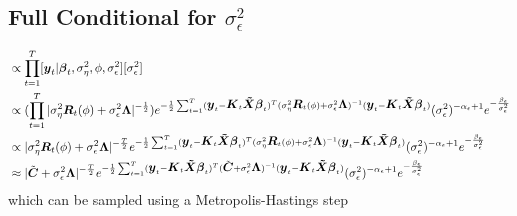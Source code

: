\documentclass[fleqn]{article}
\def\bm#1{\mbox{\boldmath $#1$}}
\begin{document}
\subsection{Full Conditional for $\sigma^2_\epsilon$}
%
\begin{align*}
[\sigma^2_\epsilon | \cdot] & \propto \prod_{t = 1}^T [\bm{y}_t | \bm{\beta}_t, \sigma^2_\eta, \phi, \sigma^2_\epsilon] [\sigma^2_\epsilon]\\
%
& \propto (\prod_{t = 1}^T |\sigma^2_\eta \bm{R}_t(\phi) + \sigma^2_\epsilon \bm{\Lambda} |^{ - \frac{1} {2}}) e^{ - \frac{1} {2} \sum_{t = 1}^T (\bm{y}_t - \bm{K}_t \bm{\tilde{X}} \bm{\beta}_t)^T (\sigma^2_\eta \bm{R}_t(\phi) + \sigma^2_\epsilon \bm{\Lambda})^{ - 1} (\bm{y}_t - \bm{K}_t \bm{\tilde{X}} \bm{\beta}_t)} (\sigma^2_\epsilon)^{ - \alpha_\epsilon + 1} e^{ - \frac{\beta_\epsilon} {\sigma^2_\epsilon}}\\
%
& \propto |\sigma^2_\eta \bm{R}_t(\phi) + \sigma^2_\epsilon \bm{\Lambda} |^{ - \frac{T} {2}} e^{ - \frac{1} {2} \sum_{t = 1}^T (\bm{y}_t - \bm{K}_t \bm{\tilde{X}} \bm{\beta}_t)^T (\sigma^2_\eta \bm{R}_t(\phi) + \sigma^2_\epsilon \bm{\Lambda})^{ - 1} (\bm{y}_t - \bm{K}_t \bm{\tilde{X}} \bm{\beta}_t)} (\sigma^2_\epsilon)^{ - \alpha_\epsilon + 1} e^{ - \frac{\beta_\epsilon} {\sigma^2_\epsilon}}\\
& \approx |\tilde{\bm{C}} + \sigma^2_\epsilon \bm{\Lambda} |^{ - \frac{T} {2}} e^{ - \frac{1} {2} \sum_{t = 1}^T (\bm{y}_t - \bm{K}_t \bm{\tilde{X}} \bm{\beta}_t)^T (\tilde{\bm{C}} + \sigma^2_\epsilon \bm{\Lambda})^{ - 1} (\bm{y}_t - \bm{K}_t \bm{\tilde{X}} \bm{\beta}_t)} (\sigma^2_\epsilon)^{ - \alpha_\epsilon + 1} e^{ - \frac{\beta_\epsilon} {\sigma^2_\epsilon}}
\end{align*}
% 
which can be sampled using a Metropolis-Hastings step
%
\end{document}
